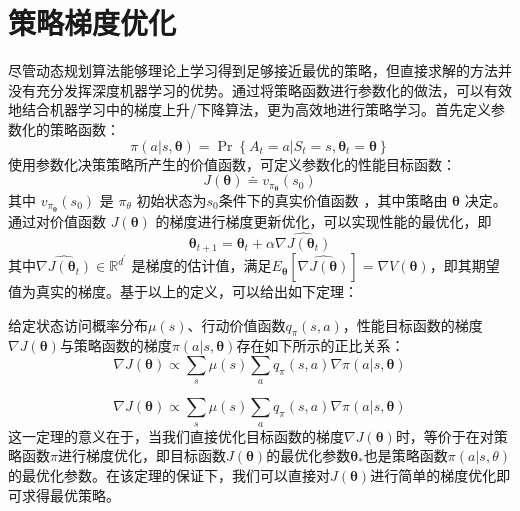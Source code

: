 \section{策略梯度优化}

尽管动态规划算法能够理论上学习得到足够接近最优的策略，但直接求解的方法并没有充分发挥深度机器学习的优势。通过将策略函数进行参数化的做法，可以有效地结合机器学习中的梯度上升/下降算法，更为高效地进行策略学习。首先定义参数化的策略函数：
\begin{equation}
\pi ( a | s , \boldsymbol { \theta } ) = \operatorname { Pr } \left\{ A _ { t } = a | S _ { t } = s , \boldsymbol { \theta } _ { t } = \boldsymbol { \theta } \right\}
\end{equation}
使用参数化决策策略所产生的价值函数，可定义参数化的性能目标函数：
\begin{equation}
    J(\boldsymbol{\theta}) \doteq v_{\pi_{\boldsymbol{\theta}}}\left(s_{0}\right)
\end{equation}
其中 $v_{\pi_{\boldsymbol{\theta}}}\left(s_{0}\right)$ 是 $\pi_\theta$ 初始状态为$s_0$条件下的真实价值函数 ，其中策略由 $\boldsymbol{\theta}$ 决定。通过对价值函数 $J ( \boldsymbol { \theta } )$ 的梯度进行梯度更新优化，可以实现性能的最优化，即
\begin{equation}
\boldsymbol { \theta } _ { t + 1 } = \boldsymbol { \theta } _ { t } + \alpha \widehat { \nabla J \left( \boldsymbol { \theta } _ { t } \right) }
\end{equation}
其中$\widehat { \nabla J \left( \boldsymbol { \theta } _ { t } \right) } \in \mathbb { R } ^ { d ^ { \prime } }$ 是梯度的估计值，满足$E_\boldsymbol{\theta}\left[\widehat { \nabla J \left( \boldsymbol { \theta } \right) }\right]=\nabla V(\boldsymbol{\theta})$，即其期望值为真实的梯度。基于以上的定义，可以给出如下定理：
\begin{theorem}
给定状态访问概率分布$\mu(s)$、行动价值函数$q_\pi(s,a)$，性能目标函数的梯度$\nabla J(\boldsymbol{\theta})$与策略函数的梯度$\pi(a | s, \boldsymbol{\theta})$存在如下所示的正比关系：
\begin{equation}
    \nabla J(\boldsymbol{\theta}) \propto \sum_{s} \mu(s) \sum_{a} q_{\pi}(s, a) \nabla \pi(a | s, \boldsymbol{\theta})
\end{equation}
\end{theorem}

\begin{equation}
    \nabla J(\boldsymbol{\theta}) \propto \sum_{s} \mu(s) \sum_{a} q_{\pi}(s, a) \nabla \pi(a | s, \boldsymbol{\theta})
\end{equation}
这一定理的意义在于，当我们直接优化目标函数的梯度$\nabla J(\boldsymbol{\theta})$时，等价于在对策略函数$\pi$进行梯度优化，即目标函数$J(\boldsymbol{\theta})$的最优化参数$\boldsymbol{\theta_*}$也是策略函数$\pi(a|s,\theta)$的最优化参数。在该定理的保证下，我们可以直接对$J(\boldsymbol{\theta})$进行简单的梯度优化即可求得最优策略。

